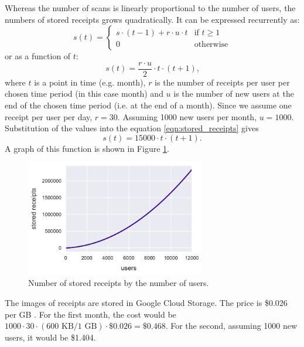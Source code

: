 \documentclass[
  printed, %
  table,   %
  oneside, %
  lof,     %
  lot,     %
]{fithesis3}
\begin{document}
Whereas the number of scans is linearly proportional to the number of users, the numbers of stored receipts grows quadratically. It can be expressed recurrently as: 
\begin{equation}
    s(t) = \begin{cases}
        s \cdot (t-1) + r \cdot u \cdot t & \text{if }t\geq1\\
        0 & \text{otherwise}
    \end{cases}
\end{equation}
or as a function of $t$:
\begin{equation}
\label{eqn:stored_receipts}
s(t) = \frac{r \cdot u}{2} \cdot t \cdot (t + 1)\text{,}
\end{equation}
where $t$ is a point in time (e.g. month), $r$ is the number of receipts per user per chosen time period (in this case month) and $u$ is the number of new users at the end of the chosen time period (i.e. at the end of a month). Since we assume one receipt per user per day, $r = 30$. Assuming \num{1000} new users per month, $u = \num{1000}$. 
Substitution of the values into the equation \ref{eqn:stored_receipts} gives
\begin{equation}
s(t) = \num{15000} \cdot t \cdot (t + 1)\text{.}
\end{equation}
A graph of this function is shown in Figure \ref{fig:receipts_by_users}.

\begin{figure}
    \begin{center}
        \includegraphics[width=0.7\textwidth]{figures/graphs/receipts_by_users}
    \end{center}
    \caption{Number of stored receipts by the number of users.}
    \label{fig:receipts_by_users}
\end{figure}

The images of receipts are stored in Google Cloud Storage. The price is \$0.026 per GB \cite{CloudStoragePricing}. For the first month, the cost would be $\num{1000} \cdot 30 \cdot (600\text{ KB} / 1\text{ GB}) \cdot \$0.026 = \$0.468$.
For the second, assuming \num{1000} new users, it would be \$1.404.
\end{document}
